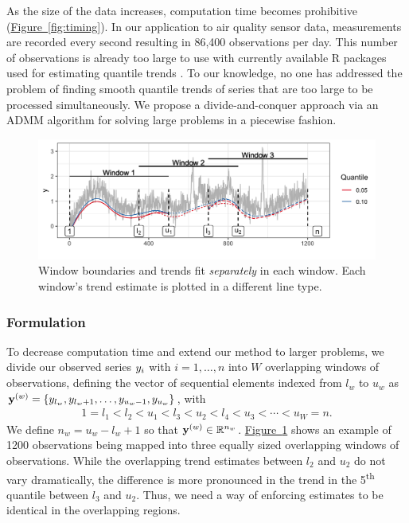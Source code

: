 \documentclass[aoas]{imsart}
\newcommand{\Fig}[1]{\hyperref[fig:#1]{Figure~\ref*{fig:#1}}} %
\newcommand{\Fig}[1]{{Figure~\ref{fig:#1}}} %
\newcommand{\Real}{\mathbb{R}}
\newcommand{\V}[1]{{\bm{\mathbf{\MakeLowercase{#1}}}}} %
\newcommand{\VE}[2]{\MakeLowercase{#1}_{#2}} %
\newcommand{\Vn}[2]{\V{#1}^{(#2)}} %
\begin{document}
 As the size of the data increases, computation time becomes prohibitive (\Fig{timing}). In our application to air quality sensor data, measurements are recorded every second resulting in 86,400 observations per day. This number of observations is already too large to use with currently available R packages used for estimating quantile trends \citep{fields, quantreg}. To our knowledge, no one has addressed the problem of finding smooth quantile trends of series that are too large to be processed simultaneously. We propose a divide-and-conquer approach via an ADMM algorithm for solving large problems in a piecewise fashion. 
 
 \begin{figure}[!t]
 	\centering
 	\includegraphics[width = 0.8\linewidth]{Figures/overlapping_windows.png}
 	\caption{Window boundaries and trends fit {\em separately} in each window. Each window's trend estimate is plotted in a different line type.}
 	\label{fig:windows}
 \end{figure}
 
\subsubsection{Formulation}
 
 To decrease computation time and extend our method to larger problems, we divide our observed series $\VE{y}{i}$ with $i = 1, \ldots, n$ into $W$ overlapping windows of observations, defining the vector of sequential elements indexed from $l_w$ to $u_w$ as $\Vn{y}{w} = \{y_{l_w}, y_{l_w + 1}, \ldots, y_{u_w -1}, y_{u_w}\}$, with 
 \begin{eqnarray*}
 	1 = l_{1} < l_{2} < u_{1} < l_{3} < u_{2} < l_{4} < u_{3} < \cdots < u_{W} = n.
 \end{eqnarray*}
 We define $n_w = u_w-l_w+1$ so that $\Vn{y}{w} \in \Real^{n_w}$. \Fig{windows} shows an example of 1200 observations being mapped into three equally sized overlapping windows of observations. While the overlapping trend estimates between $l_2$ and $u_2$ do not vary dramatically, the difference is more pronounced in the trend in the 5\textsuperscript{th} quantile between $l_3$ and $u_2$. Thus, we need a way of enforcing estimates to be identical in the overlapping regions. 
 
\end{document}
